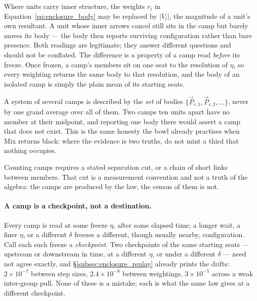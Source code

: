 \documentclass[12pt, a4paper]{article}
\begin{document}
Where units carry inner structure, the weights $r_i$ in
Equation~\eqref{eq:enclosure_body} may be replaced by
$\lvert V_i\rvert$, the magnitude of a unit's own resultant. A unit
whose inner arrows cancel still sits in the camp but barely moves its
body --- the body then reports surviving configuration rather than
bare presence. Both readings are legitimate; they answer different
questions and should not be conflated. The difference is a property
of a camp read \emph{before} its freeze. Once frozen, a camp's
members sit on one seat to the resolution of $\eta$, so every
weighting returns the same body to that resolution, and the body of
an isolated camp is simply the plain mean of its starting seats.

A system of several camps is described by the \emph{set} of bodies
$\{\vec P_{c,1},\vec P_{c,2},\ldots\}$, never by one grand average
over all of them. Two camps ten units apart have no member at their
midpoint, and reporting one body there would assert a camp that does
not exist. This is the same honesty the bowl already practises when
Mix returns black: where the evidence is two truths, do not mint a
third that nothing occupies.

Counting camps requires a stated separation cut, or a chain of short
links between members. That cut is a measurement convention and not
a truth of the algebra: the camps are produced by the law, the
census of them is not.

\paragraph{A camp is a checkpoint, not a destination.}
Every camp is read at some freeze $\eta$, after some elapsed time; a
longer wait, a finer $\eta$, or a different $\delta$ freezes a
different, though usually nearby, configuration. Call each such
freeze a \emph{checkpoint}. Two checkpoints of the same starting
seats --- upstream or downstream in time, at a different $\eta$, or
under a different $\delta$ --- need not agree exactly, and
\S\ref{subsec:enclosure_replay} already prints the drifts: $2\times
10^{-7}$ between step sizes, $2.4\times10^{-8}$ between weightings,
$3\times10^{-5}$ across a weak inter-group pull. None of these is a
mistake; each is what the same law gives at a different checkpoint.
\end{document}
